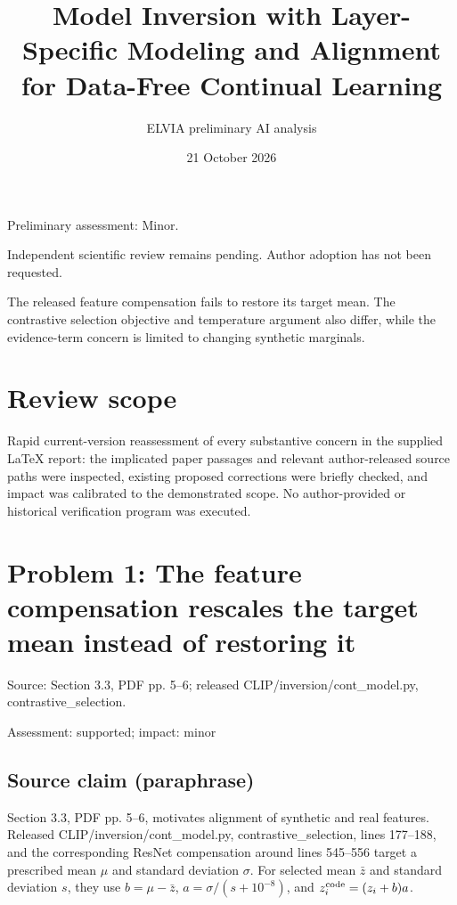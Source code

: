\documentclass[11pt]{article}
\begin{document}
\title{Model Inversion with Layer-Specific Modeling and Alignment for Data-Free Continual Learning}

\author{ELVIA preliminary AI analysis}\date{21 October 2026}\maketitle

Preliminary assessment: Minor.\par

Independent scientific review remains pending. Author adoption has not been requested.

The released feature compensation fails to restore its target mean. The contrastive selection objective and temperature argument also differ, while the evidence-term concern is limited to changing synthetic marginals.

\section*{Review scope}

Rapid current-version reassessment of every substantive concern in the supplied LaTeX report: the implicated paper passages and relevant author-released source paths were inspected, existing proposed corrections were briefly checked, and impact was calibrated to the demonstrated scope. No author-provided or historical verification program was executed.

\section*{Problem 1: The feature compensation rescales the target mean instead of restoring it}

Source: Section 3.3, PDF pp. 5–6; released CLIP/inversion/cont\_model.py, contrastive\_selection.

Assessment: supported; impact: minor

\subsection*{Source claim (paraphrase)}

Section 3.3, PDF pp. 5–6, motivates alignment of synthetic and real features. Released CLIP/inversion/cont\_model.py, contrastive\_selection, lines 177–188, and the corresponding ResNet compensation around lines 545–556 target a prescribed mean \(\mu\) and standard deviation \(\sigma\). For selected mean \(\bar z\) and standard deviation \(s\), they use \(b=\mu-\bar z\), \(a=\sigma/(s+10^{-8})\), and \(z_i^{\rm code}=(z_i+b)a\).
\end{document}
